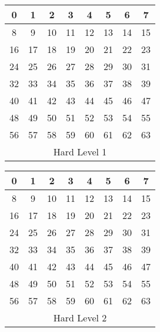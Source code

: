\documentclass{article}
\begin{document}
\begin{center}
\begin{tabular}{|c|c|c|c|c|c|c|c|}
  \hline
    0 &  1 &  2 &  3 &  4 &  5 &  6 & 7 \\\hline
    8 &  9 & 10 & 11 & 12 & 13 & 14 & 15 \\\hline
    16 & 17 & 18 & 19 & 20 & 21 & 22 & 23 \\\hline
    24 & 25 & 26 & 27 & 28 & 29 & 30 & 31 \\\hline
    32 &  33 &  34 &  35 &  36 &  37 &  38 & 39 \\\hline
    40 &  41 & 42 & 43 & 44 & 45 & 46 & 47 \\\hline
    48 & 49 & 50 & 51 & 52 & 53 & 54 & 55 \\\hline
    56 & 57 & 58 & 59 & 60 & 61 & 62 & 63 \\\hline
   \multicolumn{8}{c}{Hard Level 1}\\
\end{tabular}


\begin{tabular}{|c|c|c|c|c|c|c|c|}
  \hline
    0 &  1 &  2 &  3 &  4 &  5 &  6 & 7 \\\hline
    8 &  9 & 10 & 11 & 12 & 13 & 14 & 15 \\\hline
    16 & 17 & 18 & 19 & 20 & 21 & 22 & 23 \\\hline
    24 & 25 & 26 & 27 & 28 & 29 & 30 & 31 \\\hline
    32 &  33 &  34 &  35 &  36 &  37 &  38 & 39 \\\hline
    40 &  41 & 42 & 43 & 44 & 45 & 46 & 47 \\\hline
    48 & 49 & 50 & 51 & 52 & 53 & 54 & 55 \\\hline
    56 & 57 & 58 & 59 & 60 & 61 & 62 & 63 \\\hline
   \multicolumn{8}{c}{Hard Level 2}\\
\end{tabular}



\end{center}
\end{document}
